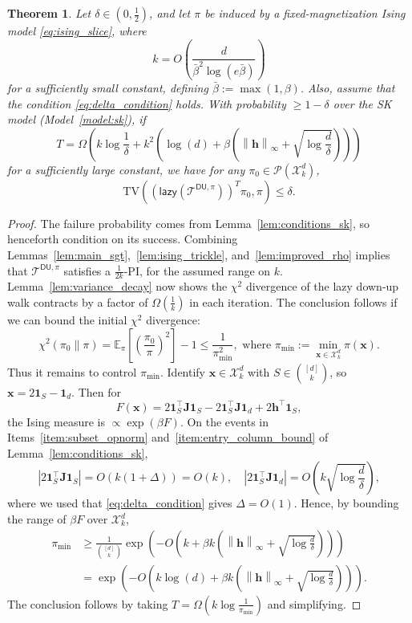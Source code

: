 \documentclass[11pt]{article}
\newtheorem{theorem}{Theorem}
\newcommand{\defeq}{:=}
\newcommand{\norm}[1]{\left\lVert#1\right\rVert}
\newcommand{\half}{\frac{1}{2}}
\newcommand{\1}{\mathbf{1}}
\newcommand{\0}{\mathbf{0}}
\newcommand{\E}{\mathbb{E}}
\newcommand{\Par}[1]{\left(#1\right)}
\newcommand{\Brack}[1]{\left[#1\right]}
\newcommand{\Abs}[1]{\left|#1\right|}
\newcommand{\TV}[1]{\mathrm{TV}\left(#1\right)}
\newcommand{\lazy}{\mathsf{lazy}}
\newcommand{\mj}{{\mathbf{J}}}
\newcommand{\vh}{{\mathbf{h}}}
\newcommand{\vx}{{\mathbf{x}}}
\newcommand{\calP}{{\mathcal{P}}}
\newcommand{\calT}{{\mathcal{T}}}
\newcommand{\calX}{{\mathcal{X}}}
\newcommand{\TDU}[1]{\calT^{\mathsf{DU}, #1}}
\begin{document}
\begin{theorem}\label{thm:sk_trickle}
Let $\delta \in (0, \half)$, and let $\pi$ be induced by a fixed-magnetization Ising model \eqref{eq:ising_slice}, where
\[k = O\Par{\frac{d}{\bar{\beta}^2 \log(e\bar{\beta})}}\]
for a sufficiently small constant, defining $\bar{\beta} \defeq \max(1, \beta)$. Also, assume that the condition \eqref{eq:delta_condition} holds. 
With probability $\ge 1 - \delta$ over the SK model (Model~\ref{model:sk}), if
\[T = \Omega\Par{k\log \frac 1 \delta + k^2\Par{\log(d) + \beta\Par{\norm{\vh}_\infty + \sqrt{\log \frac d \delta}}}}\]
for a sufficiently large constant, we have for any $\pi_0 \in \calP(\calX^d_k)$,
\[\TV{\Par{\lazy(\TDU{\pi})}^T \pi_0, \pi} \le \delta.\]
\end{theorem}
\begin{proof}
The failure probability comes from Lemma~\ref{lem:conditions_sk}, so henceforth condition on its success. Combining Lemmas~\ref{lem:main_sgt},~\ref{lem:ising_trickle}, and~\ref{lem:improved_rho} implies that $\TDU{\pi}$ satisfies a $\frac 1 {2k}$-PI, for the assumed range on $k$. 
Lemma~\ref{lem:variance_decay} now shows the $\chi^2$ divergence of the lazy down-up walk contracts by a factor of $\Omega(\frac 1 k)$ in each iteration. 
The conclusion follows if
we can bound the initial $\chi^2$ divergence:
\[\chi^2\Par{\pi_0 \| \pi} = \E_{\pi}\Brack{\Par{\frac{\pi_0}{\pi}}^2} - 1 \le \frac{1}{\pi_{\min}^2},\text{ where } \pi_{\min} \defeq \min_{\vx \in \calX^d_k} \pi(\vx).\]
Thus it remains to control $\pi_{\min}$. Identify $\vx \in \calX^d_k$ with $S \in \binom{[d]}{k}$, so $\vx = 2\1_S - \1_d$. Then for
\[F(\vx) = 2\1_S^\top \mj \1_S- 2\1_S^\top \mj \1_d + 2\vh^\top \1_S,\]
the Ising measure is $\propto \exp(\beta F)$. On the events in Items~\ref{item:subset_opnorm} and~\ref{item:entry_column_bound} of Lemma~\ref{lem:conditions_sk},
\[\Abs{2\1_S^\top \mj \1_S } = O\Par{k(1 + \Delta)} = O(k),\quad \Abs{2\1_S^\top \mj\1_d} =O\Par{k\sqrt{\log \frac d \delta}},\]
where we used that \eqref{eq:delta_condition} gives $\Delta = O(1)$.
Hence, by bounding the range of $\beta F$ over $\calX^d_k$,
\begin{align*}\pi_{\min} &\ge \frac 1 {\binom{[d]}{k}}\exp\Par{-O\Par{k + \beta k \Par{\norm{\vh}_\infty +\sqrt{\log \frac d \delta}}}} \\
&= \exp\Par{-O\Par{k \log(d) + \beta k \Par{\norm{\vh}_\infty +\sqrt{\log \frac d \delta}}}}.\end{align*}
The conclusion follows by taking $T = \Omega(k\log \frac 1 {\pi_{\min}})$ and simplifying.
\end{proof}
\end{document}
